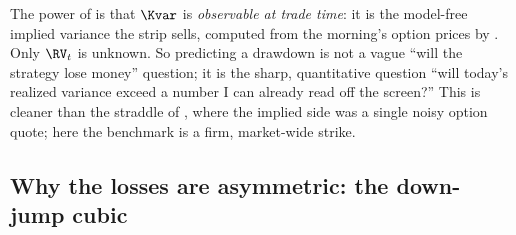 \begin{keyidea}
The power of  is that $\Kvar$ is \emph{observable at trade time}: it is the model-free implied variance the strip sells, computed from the morning's option prices by . Only $\RV_t$ is unknown. So predicting a drawdown is not a vague ``will the strategy lose money'' question; it is the sharp, quantitative question ``will today's realized variance exceed a number I can already read off the screen?'' This is cleaner than the straddle of , where the implied side was a single noisy option quote; here the benchmark is a firm, market-wide strike.
\end{keyidea}

\subsection*{Why the losses are asymmetric: the down-jump cubic}

